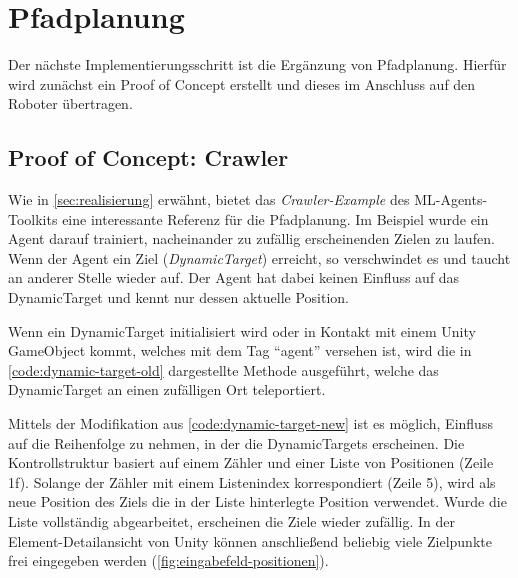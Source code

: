 \section{Pfadplanung}
Der nächste Implementierungsschritt ist die Ergänzung von Pfadplanung.
Hierfür wird zunächst ein Proof of Concept erstellt und dieses im Anschluss auf den Roboter übertragen.

\subsection{Proof of Concept: Crawler}
Wie in \autoref{sec:realisierung} erwähnt, bietet das \emph{Crawler-Example} des ML-Agents-Toolkits eine interessante Referenz für die Pfadplanung.
Im Beispiel wurde ein Agent darauf trainiert, nacheinander zu zufällig erscheinenden Zielen zu laufen.
Wenn der Agent ein Ziel (\emph{DynamicTarget}) erreicht, so verschwindet es und taucht an anderer Stelle wieder auf.
Der Agent hat dabei keinen Einfluss auf das DynamicTarget und kennt nur dessen aktuelle Position.

Wenn ein DynamicTarget initialisiert wird oder in Kontakt mit einem Unity GameObject kommt, welches mit dem Tag \enquote{agent} versehen ist, wird die in \autoref{code:dynamic-target-old} dargestellte Methode ausgeführt, welche das DynamicTarget an einen zufälligen Ort teleportiert.

\begin{figure}
    
\end{figure}

Mittels der Modifikation aus \autoref{code:dynamic-target-new} ist es möglich, Einfluss auf die Reihenfolge zu nehmen, in der die DynamicTargets erscheinen.
Die Kontrollstruktur basiert auf einem Zähler und einer Liste von Positionen (Zeile 1f).
Solange der Zähler mit einem Listenindex korrespondiert (Zeile 5), wird als neue Position des Ziels die in der Liste hinterlegte Position verwendet.
Wurde die Liste vollständig abgearbeitet, erscheinen die Ziele wieder zufällig.
In der Element-Detailansicht von Unity können anschließend beliebig viele Zielpunkte frei eingegeben werden (\autoref{fig:eingabefeld-positionen}).

\begin{figure}
    
\end{figure}

